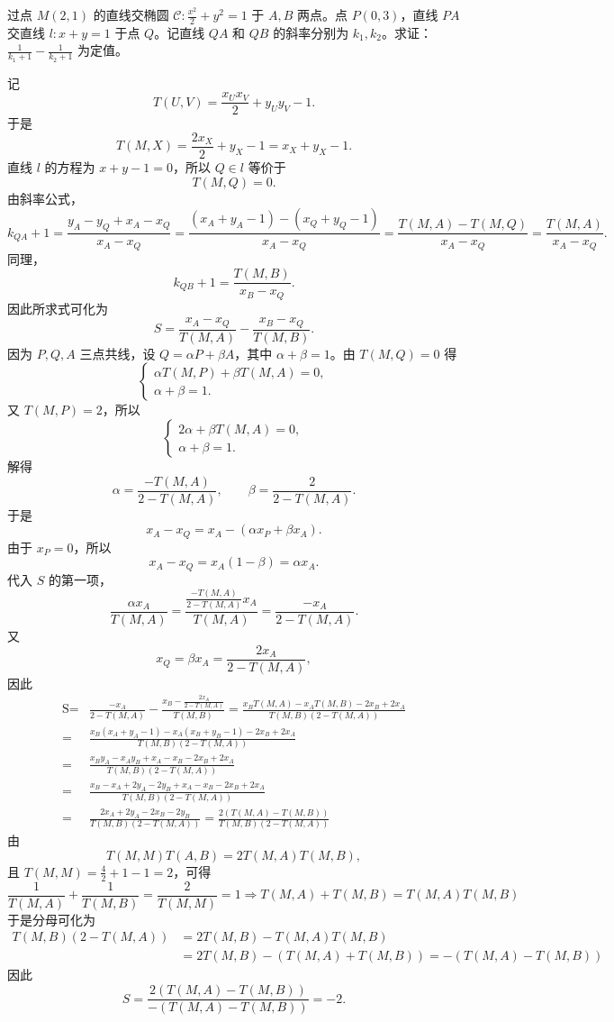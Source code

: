 \begin{exercise}
过点 $M(2,1)$ 的直线交椭圆 $\mathcal{C}: \frac{x^2}{2} + y^2 = 1$ 于 $A, B$ 两点。点 $P(0,3)$，直线 $PA$ 交直线 $l: x+y=1$ 于点 $Q$。记直线 $QA$ 和 $QB$ 的斜率分别为 $k_1, k_2$。求证：$\frac{1}{k_1+1} - \frac{1}{k_2+1}$ 为定值。
\end{exercise}
\begin{solution}
记
$$T(U,V) = \frac{x_U x_V}{2} + y_U y_V - 1.$$
于是
$$T(M, X) = \frac{2 x_X}{2} + y_X - 1 = x_X + y_X - 1.$$
直线 $l$ 的方程为 $x+y-1=0$，所以 $Q \in l$ 等价于
$$T(M,Q)=0.$$
由斜率公式，
$$ k_{QA} + 1 = \frac{y_A - y_Q + x_A - x_Q}{x_A - x_Q}
= \frac{(x_A + y_A - 1) - (x_Q + y_Q - 1)}{x_A - x_Q}
= \frac{T(M,A) - T(M,Q)}{x_A - x_Q}
= \frac{T(M,A)}{x_A - x_Q}.$$
同理，
$$k_{QB} + 1 = \frac{T(M,B)}{x_B - x_Q}.$$
因此所求式可化为
$$ S=\frac{x_A - x_Q}{T(M,A)} - \frac{x_B - x_Q}{T(M,B)}. $$
因为 $P, Q, A$ 三点共线，设 $Q = \alpha P + \beta A$，其中 $\alpha+\beta=1$。由 $T(M,Q)=0$ 得
\[\begin{cases}
\alpha T(M,P) + \beta T(M,A) = 0,\\
\alpha+\beta=1.
\end{cases}\]
又 $T(M,P)=2$，所以
\[\begin{cases}
2\alpha + \beta T(M,A) = 0,\\
\alpha+\beta=1.
\end{cases}\]
解得
$$\alpha = \frac{-T(M,A)}{2 - T(M,A)},\qquad \beta = \frac{2}{2 - T(M,A)}.$$
于是
$$x_A - x_Q = x_A - (\alpha x_P + \beta x_A).$$
由于 $x_P = 0$，所以
$$x_A - x_Q = x_A(1-\beta) = \alpha x_A.$$
代入 $S$ 的第一项，
$$ \frac{\alpha x_A}{T(M,A)} = \frac{ \frac{-T(M,A)}{2 - T(M,A)} x_A }{T(M,A)} = \frac{-x_A}{2 - T(M,A)}.$$
又
$$x_Q = \beta x_A = \frac{2x_A}{2-T(M,A)},$$
因此
\begin{align*}
\text{S} =& \frac{-x_A}{2 - T(M,A)} - \frac{x_B - \frac{2x_A}{2 - T(M,A)}}{T(M,B)} = \frac{ x_B T(M,A)-x_A T(M,B) - 2x_B  + 2x_A}{T(M,B)(2 - T(M,A))}\\
=&\frac{x_B(x_A+y_A-1) - x_A(x_B+y_B-1)- 2x_B  + 2x_A}{T(M,B)(2 - T(M,A))}\\
=&\frac{ x_B y_A - x_A y_B + x_A - x_B- 2x_B  + 2x_A}{T(M,B)(2 - T(M,A))}\\
=&\frac{ x_B - x_A + 2y_A - 2y_B+ x_A - x_B- 2x_B  + 2x_A}{T(M,B)(2 - T(M,A))}\\
=&\frac{ 2x_A + 2y_A - 2x_B - 2y_B}{T(M,B)(2 - T(M,A))}=\frac{ 2(T(M,A) - T(M,B))}{T(M,B)(2 - T(M,A))}
\end{align*}
由
$$T(M,M)T(A,B) = 2T(M,A)T(M,B),$$
且 $T(M,M) = \frac{4}{2}+1-1 = 2$，可得
\[\frac{1}{T(M,A)} + \frac{1}{T(M,B)} = \frac{2}{T(M,M)} = 1 \Rightarrow T(M,A) + T(M,B) = T(M,A)T(M,B)\]
于是分母可化为
\begin{align*}
T(M,B)(2 - T(M,A)) &= 2T(M,B) - T(M,A)T(M,B) \\
&= 2T(M,B) - (T(M,A) + T(M,B)) = -(T(M,A) - T(M,B))
\end{align*}
因此
$$S = \frac{2(T(M,A) - T(M,B))}{-(T(M,A) - T(M,B))} = -2.$$

\end{solution}

